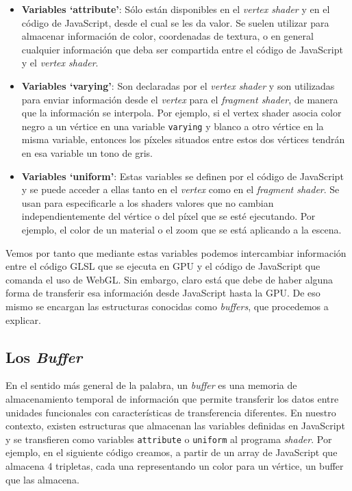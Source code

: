 \begin{itemize}
    \item \textbf{Variables `attribute'}: Sólo están disponibles en el \textit{vertex shader} y en el código de JavaScript, desde el cual se les da valor. Se suelen utilizar para almacenar información de color, coordenadas de textura, o en general cualquier información que deba ser compartida entre el código de JavaScript y el \textit{vertex shader}.
    \item \textbf{Variables `varying'}: Son declaradas por el \textit{vertex shader} y son utilizadas para enviar información desde el \textit{vertex} para el \textit{fragment shader}, de manera que la información se interpola. Por ejemplo, si el vertex shader asocia color negro a un vértice en una variable \verb|varying| y blanco a otro vértice en la misma variable, entonces los píxeles situados entre estos dos vértices tendrán en esa variable un tono de gris.
    \item \textbf{Variables `uniform'}: Estas variables se definen por el código de JavaScript y se puede acceder a ellas tanto en el \textit{vertex} como en el \textit{fragment shader}. Se usan para especificarle a los shaders valores que no cambian independientemente del vértice o del píxel que se esté ejecutando. Por ejemplo, el color de un material o el zoom que se está aplicando a la escena.
\end{itemize}

Vemos por tanto que mediante estas variables podemos intercambiar información entre el código GLSL que se ejecuta en GPU y el código de JavaScript que comanda el uso de WebGL. Sin embargo, claro está que debe de haber alguna forma de transferir esa información desde JavaScript hasta la GPU. De eso mismo se encargan las estructuras conocidas como \textit{buffers}, que procedemos a explicar.

\subsection{Los \textit{Buffer}}

En el sentido más general de la palabra, un \textit{buffer} es una memoria de almacenamiento temporal de información que permite transferir los datos entre unidades funcionales con características de transferencia diferentes. En nuestro contexto, existen estructuras que almacenan las variables definidas en JavaScript y se transfieren como variables \verb|attribute| o \verb|uniform| al programa \textit{shader}. Por ejemplo, en el siguiente código creamos, a partir de un array de JavaScript que almacena 4 tripletas, cada una representando un color para un vértice, un buffer que las almacena.

